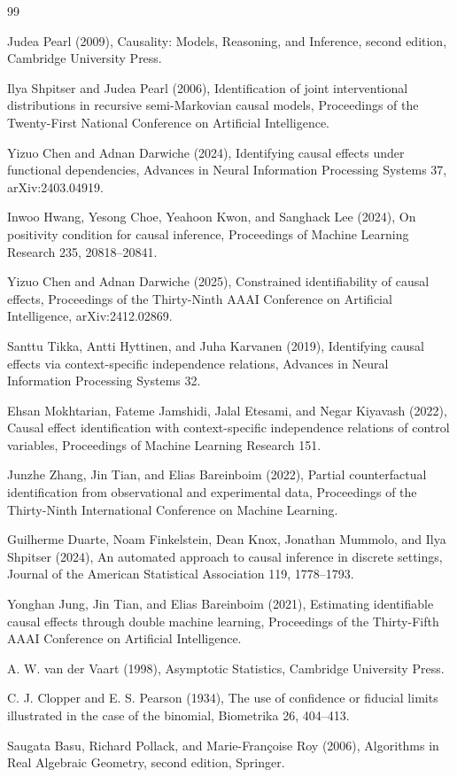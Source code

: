 \documentclass{article}
\begin{document}
\begin{thebibliography}{99}

   Judea Pearl (2009), Causality: Models, Reasoning, and Inference, second edition, Cambridge University Press.

   Ilya Shpitser and Judea Pearl (2006), Identification of joint interventional distributions in recursive semi-Markovian causal models, Proceedings of the Twenty-First National Conference on Artificial Intelligence.

   Yizuo Chen and Adnan Darwiche (2024), Identifying causal effects under functional dependencies, Advances in Neural Information Processing Systems 37, arXiv:2403.04919.

   Inwoo Hwang, Yesong Choe, Yeahoon Kwon, and Sanghack Lee (2024), On positivity condition for causal inference, Proceedings of Machine Learning Research 235, 20818--20841.

   Yizuo Chen and Adnan Darwiche (2025), Constrained identifiability of causal effects, Proceedings of the Thirty-Ninth AAAI Conference on Artificial Intelligence, arXiv:2412.02869.

   Santtu Tikka, Antti Hyttinen, and Juha Karvanen (2019), Identifying causal effects via context-specific independence relations, Advances in Neural Information Processing Systems 32.

   Ehsan Mokhtarian, Fateme Jamshidi, Jalal Etesami, and Negar Kiyavash (2022), Causal effect identification with context-specific independence relations of control variables, Proceedings of Machine Learning Research 151.

   Junzhe Zhang, Jin Tian, and Elias Bareinboim (2022), Partial counterfactual identification from observational and experimental data, Proceedings of the Thirty-Ninth International Conference on Machine Learning.

   Guilherme Duarte, Noam Finkelstein, Dean Knox, Jonathan Mummolo, and Ilya Shpitser (2024), An automated approach to causal inference in discrete settings, Journal of the American Statistical Association 119, 1778--1793.

   Yonghan Jung, Jin Tian, and Elias Bareinboim (2021), Estimating identifiable causal effects through double machine learning, Proceedings of the Thirty-Fifth AAAI Conference on Artificial Intelligence.

   A. W. van der Vaart (1998), Asymptotic Statistics, Cambridge University Press.

   C. J. Clopper and E. S. Pearson (1934), The use of confidence or fiducial limits illustrated in the case of the binomial, Biometrika 26, 404--413.

   Saugata Basu, Richard Pollack, and Marie-Françoise Roy (2006), Algorithms in Real Algebraic Geometry, second edition, Springer.

\end{thebibliography}
\end{document}
